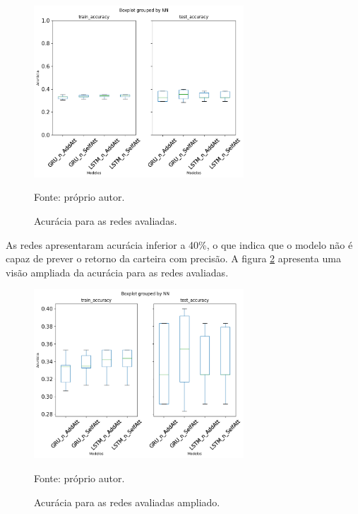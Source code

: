         \begin{figure}[H]
            \centering
            \caption{Acurácia para as redes avaliadas.}
            \label{fig:accuracy}
            \includegraphics[width=0.7\textwidth]{./imagens/boxplot_val_01.png}
            \par \footnotesize Fonte: próprio autor.
        \end{figure}

        \ipar As redes apresentaram acurácia inferior a 40\%, o que indica que o modelo não é capaz de prever o retorno da carteira com precisão. A figura \ref{fig:boxplotval_zoom} apresenta uma visão ampliada da acurácia para as redes avaliadas.

        \begin{figure}[H]
            \centering
            \caption{Acurácia para as redes avaliadas ampliado.}
            \label{fig:boxplotval_zoom}
            \includegraphics[width=0.7\textwidth]{./imagens/boxplotval_zoom.png}
            \par \footnotesize Fonte: próprio autor.
        \end{figure}

